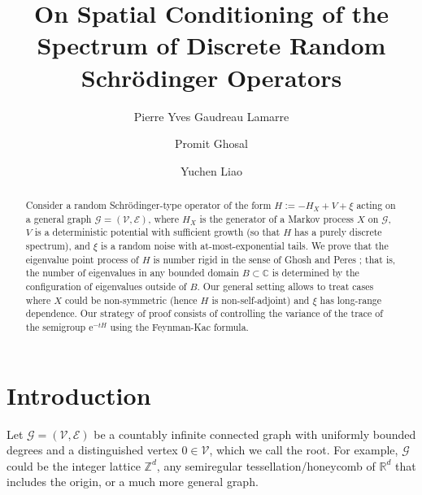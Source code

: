 \documentclass{amsart}
\numberwithin{equation}{section}
\theoremstyle{definition}
\newcommand\mbb{\mathbb}
\newcommand\mr{\mathrm}
\newcommand\ms{\mathscr}
\begin{document}
%

\title[Spectral Conditioning of Discrete Random Schr\"odinger Operators]
{On Spatial Conditioning of the Spectrum of Discrete Random Schr\"odinger Operators}
\author{Pierre Yves Gaudreau Lamarre}
\address{University of Chicago, Chicago, IL\space{}, USA}
\author{Promit Ghosal}
\address{Massachusetts Institute of Technology, Cambridge, MA\space{}, USA}
\author{Yuchen Liao}
\address{University of Warwick, Coventry\space\space CV4 7AL, UK}
\maketitle

%

\begin{abstract}
Consider a random Schr\"odinger-type operator of the form $H:=-H_X+V+\xi$ acting on a general
graph $\ms G=(\ms V,\ms E)$, where $H_X$ is the generator of a Markov process $X$ on $\ms G$, $V$ is a deterministic
potential with sufficient growth (so that $H$ has a purely
discrete spectrum), and $\xi$ is a random noise with at-most-exponential tails.
We prove that
the eigenvalue point process of $H$ is number rigid in the sense of Ghosh and Peres \cite{GP17}; that is,
the number of eigenvalues in any bounded domain $B\subset\mbb C$ is determined by the configuration
of eigenvalues outside of $B$.
Our general setting allows to treat cases where $X$ could be non-symmetric (hence $H$ is non-self-adjoint) and $\xi$ has long-range dependence.
Our strategy of proof consists of controlling the variance of the
trace of the semigroup $\mr e^{-t H}$ using the Feynman-Kac formula.
\end{abstract}

%


\section{Introduction}

%

Let $\ms G=(\ms V,\ms E)$ be a countably infinite connected graph
with uniformly bounded degrees and a distinguished vertex $0\in\ms V$, which we call the root.
For example, $\ms G$ could be the integer lattice $\mbb Z^d$,
any semiregular tessellation/honeycomb of $\mbb R^d$ that includes the
origin, or a much more general graph.
\end{document}
